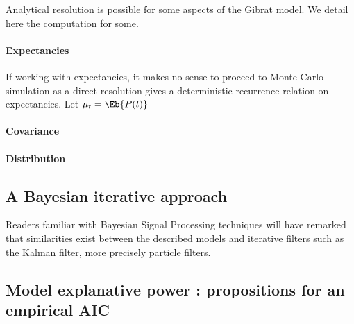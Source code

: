 Analytical resolution is possible for some aspects of the Gibrat model. We detail here the computation for some.

\paragraph{Expectancies} If working with expectancies, it makes no sense to proceed to Monte Carlo simulation as a direct resolution gives a deterministic recurrence relation on expectancies. Let $\mu_t = \Eb{P(t)}$

\paragraph{Covariance}


\paragraph{Distribution}



\subsection{A Bayesian iterative approach}

Readers familiar with Bayesian Signal Processing techniques will have remarked that similarities exist between the described models and iterative filters such as the Kalman filter, more precisely particle filters.



\subsection{Model explanative power : propositions for an empirical AIC}










